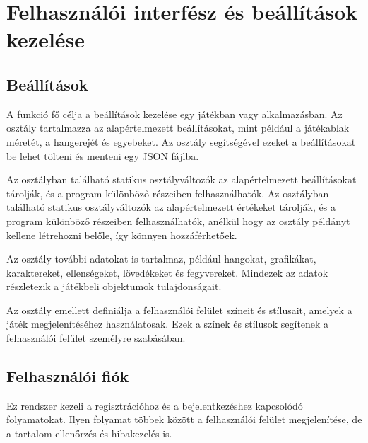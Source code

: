 
\section{Felhasználói interfész és beállítások kezelése}

\subsection{Beállítások}
\indent \indent A funkció fő célja a beállítások kezelése egy játékban vagy alkalmazásban. Az osztály tartalmazza az alapértelmezett beállításokat, mint például a játékablak méretét, a hangerejét és egyebeket. Az osztály segítségével ezeket a beállításokat be lehet tölteni és menteni egy JSON fájlba.

Az osztályban található statikus osztályváltozók az alapértelmezett beállításokat tárolják, és a program különböző részeiben felhasználhatók. Az osztályban található statikus osztályváltozók az alapértelmezett értékeket tárolják, és a program különböző részeiben felhasználhatók, anélkül hogy az osztály példányt kellene létrehozni belőle, így könnyen hozzáférhetőek.

Az osztály további adatokat is tartalmaz, például hangokat, grafikákat, karaktereket, ellenségeket, lövedékeket és fegyvereket. Mindezek az adatok részletezik a játékbeli objektumok tulajdonságait.

Az osztály emellett definiálja a felhasználói felület színeit és stílusait, amelyek a játék megjelenítéséhez használatosak. Ezek a színek és stílusok segítenek a felhasználói felület személyre szabásában.


\subsection{Felhasználói fiók}
\indent \indent Ez rendszer kezeli a regisztrációhoz és a bejelentkezéshez kapcsolódó folyamatokat. Ilyen folyamat többek között a felhasználói felület megjelenítése, de a tartalom ellenőrzés és hibakezelés is.

